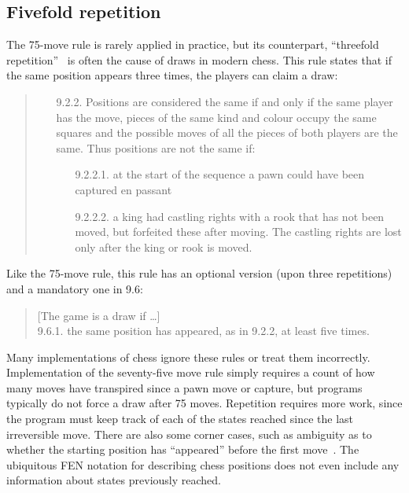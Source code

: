 \documentclass[twocolumn]{article}
\begin{document}
\subsection{Fivefold repetition} \label{sec:fivefold}

The 75-move rule is rarely applied in practice, but its
counterpart, ``threefold repetition''~\cite{wikipediathreefold} is often
the cause of draws in modern chess. This rule states that if the same
position appears three times, the players can claim a draw:

\begin{quote}
\begin{itemize}
  \item[9.2.2.] Positions are considered the same if and only if the
same player has the move, pieces of the same kind and colour occupy
the same squares and the possible moves of all the pieces of both
players are the same. Thus positions are not the same if:
\begin{itemize}
\item[9.2.2.1.]	at the start of the sequence a pawn could have been captured en passant
\item[9.2.2.2.]	a king had castling rights with a rook that has not been moved, but forfeited these after moving. The castling rights are lost only after the king or rook is moved.
\end{itemize}
\end{itemize}
\end{quote}

Like the 75-move rule, this rule has an optional version (upon
three repetitions) and a mandatory one in 9.6:

\begin{quote}
  [The game is a draw if \ldots] \\
  9.6.1. the same position has appeared, as in 9.2.2, at least five times.
\end{quote}

%

\medskip
Many implementations of chess ignore these rules or treat them
incorrectly. Implementation of the seventy-five move rule simply
requires a count of how many moves have transpired since a pawn move
or capture, but programs typically do not force a draw after 75 moves.
Repetition requires more work, since the program must keep track of
each of the states reached since the last irreversible move. There are
also some corner cases, such as ambiguity as to whether the starting
position has ``appeared'' before the first move~\cite{survival}. The
ubiquitous FEN notation for describing chess positions does not even
include any information about states previously reached.
\end{document}
